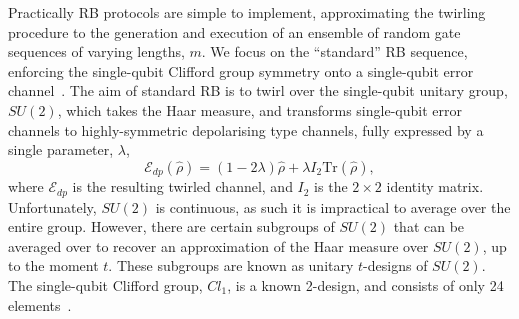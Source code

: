     Practically RB protocols are simple to implement, approximating the twirling procedure to the generation
    and execution of an ensemble of
    random gate sequences of varying lengths,
    $m$. We focus on the ``standard'' RB sequence, enforcing the single-qubit
    Clifford group symmetry onto a single-qubit
    error channel~\cite{knill_randomized_2008}. The aim of standard RB is to twirl
    over the single-qubit unitary group, $SU(2)$, which takes the Haar measure,
    and transforms single-qubit error channels to highly-symmetric depolarising
    type channels, fully expressed by a single parameter, $\lambda$,
    \begin{equation}
    \mathcal{E}_{dp}(\hat\rho) = (1-2\lambda)\hat\rho + \lambda I_2 \mathrm{Tr}(\hat\rho),
    \end{equation}
    where $\mathcal{E}_{dp}$ is the resulting twirled channel, and $I_2$ is the $2\times 2$ identity matrix.
    Unfortunately, $SU(2)$ is continuous, as such it is impractical to average over the entire group.
    However, there are certain subgroups of $SU(2)$ that can be averaged over to
    recover an approximation of the Haar measure over $SU(2)$, up to the moment
    $t$. These subgroups are known as unitary $t$-designs of $SU(2)$.
    The single-qubit Clifford group, $Cl_1$, is a known 2-design, and consists of only 24 elements~\cite{dankert_exact_2009}.\\

